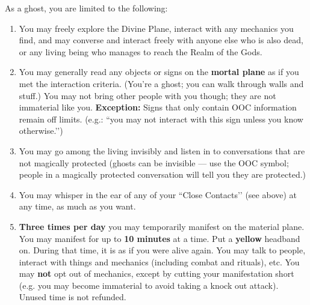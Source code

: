 \documentclass[green]{GL2020}
\begin{document}
As a ghost, you are limited to the following:
\begin{enumerate}
  \item You may freely explore the Divine Plane, interact with any mechanics you find, and may converse and interact freely with anyone else who is also dead, or any living being who manages to reach the Realm of the Gods.
  \item You may generally read any objects or signs on the \textbf{mortal plane} as if you met the interaction criteria. (You’re a ghost; you can walk through walls and stuff.) You may not bring other people with you though; they are not immaterial like you. \textbf{Exception:} Signs that only contain OOC information remain off limits. (e.g.: ``you may not interact with this sign unless you know otherwise.’’) 
  \item You may go among the living invisibly and listen in to conversations that are not magically protected (ghosts can be invisible — use the OOC symbol; people in a magically protected conversation will tell you they are protected.)
  \item You may whisper in the ear of any of your ``Close Contacts’’ (see above) at any time, as much as you want.
  \item \textbf{Three times per day} you may temporarily manifest on the material plane. You may manifest for up to \textbf{10 minutes} at a time. Put a \textbf{yellow} headband on. During that time, it is as if you were alive again. You may talk to people, interact with things and mechanics (including combat and rituals), etc. You may \textbf{not} opt out of mechanics, except by cutting your manifestation short (e.g. you may become immaterial to avoid taking a knock out attack). Unused time is not refunded.
\end{enumerate}
\end{document}
